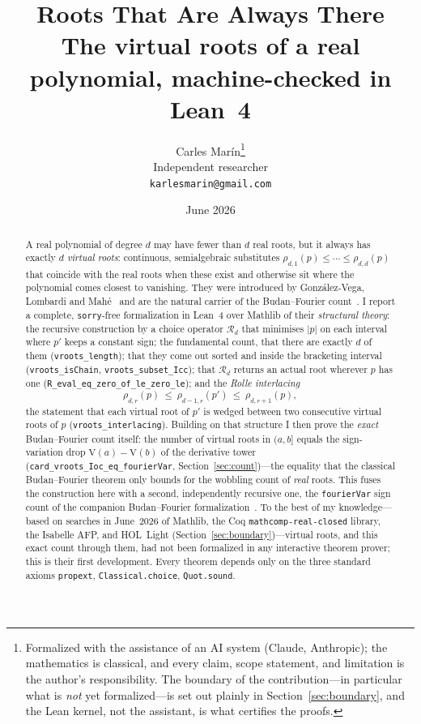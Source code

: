 \documentclass[11pt]{article}
\title{\bf Roots That Are Always There\\[4pt]
  \large\normalfont The virtual roots of a real polynomial, machine-checked in Lean~4}
\author{Carles Mar\'in\thanks{Formalized with the assistance of an AI system (Claude,
Anthropic); the mathematics is classical, and every claim, scope statement, and limitation is
the author's responsibility. The boundary of the contribution---in particular what is \emph{not}
yet formalized---is set out plainly in Section~\ref{sec:boundary}, and the Lean kernel, not the
assistant, is what certifies the proofs.}\\[3pt]
  \normalsize Independent researcher\\
  \normalsize \texttt{karlesmarin@gmail.com}}
\date{June 2026}
\newcommand{\lean}[1]{\texttt{#1}}
\newcommand{\V}{\mathrm{V}}
\newcommand{\Rd}{\mathcal{R}}
\begin{document}
\maketitle

\begin{abstract}
A real polynomial of degree $d$ may have fewer than $d$ real roots, but it always has exactly $d$
\emph{virtual roots}: continuous, semialgebraic substitutes
$\rho_{d,1}(p)\le\cdots\le\rho_{d,d}(p)$ that coincide with the real roots when these exist and
otherwise sit where the polynomial comes closest to vanishing. They were introduced by
Gonz\'alez-Vega, Lombardi and Mah\'e~\cite{glm} and are the natural carrier of the Budan--Fourier
count~\cite{coste}. I report a complete, \lean{sorry}-free formalization in Lean~4 over Mathlib of
their \emph{structural theory}: the recursive construction by a choice operator $\Rd_d$ that
minimises $|p|$ on each interval where $p'$ keeps a constant sign; the fundamental count, that there
are exactly $d$ of them (\lean{vroots\_length}); that they come out sorted and inside the bracketing
interval (\lean{vroots\_isChain}, \lean{vroots\_subset\_Icc}); that $\Rd_d$ returns an actual root
wherever $p$ has one (\lean{R\_eval\_eq\_zero\_of\_le\_zero\_le}); and the \emph{Rolle interlacing}
\[
  \rho_{d,r}(p)\ \le\ \rho_{d-1,r}(p')\ \le\ \rho_{d,r+1}(p),
\]
the statement that each virtual root of $p'$ is wedged between two consecutive virtual roots of $p$
(\lean{vroots\_interlacing}). Building on that structure I then prove the \emph{exact} Budan--Fourier
count itself: the number of virtual roots in $(a,b]$ equals the sign-variation drop $\V(a)-\V(b)$ of
the derivative tower (\lean{card\_vroots\_Ioc\_eq\_fourierVar}, Section~\ref{sec:count})---the equality
that the classical Budan--Fourier theorem only bounds for the wobbling count of \emph{real} roots. This
fuses the construction here with a second, independently recursive one, the \lean{fourierVar} sign
count of the companion Budan--Fourier formalization~\cite{bflean}. To the best of my knowledge---based
on searches in June~2026 of Mathlib, the Coq \lean{mathcomp-real-closed} library, the Isabelle AFP, and
HOL~Light (Section~\ref{sec:boundary})---virtual roots, and this exact count through them, had not been
formalized in any interactive theorem prover; this is their first development. Every theorem depends
only on the three standard axioms \lean{propext}, \lean{Classical.choice}, \lean{Quot.sound}.
\end{abstract}
\end{document}
